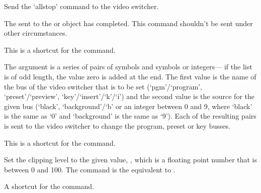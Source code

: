 

  \objListIOEnd






\objItemCommands[]

  \objListCmdBegin
  
  Send the `allstop' command to the video switcher.

  The  sent to the  or  object has completed.
  This command shouldn't be sent under other circumstances.

  This is a shortcut for the  command.

  The argument  is a series of pairs of symbols and symbols or integers---
  if the list is of odd length, the value zero is added at the end.
  The first value is the name of the bus of the video switcher that is to be set (`pgm'/`program',
  `preset'/`preview', `key'/`insert'/`k'/`i') and the second value is the source for the given bus
  (`black', `background'/`b' or an integer between 0 and 9, where `black' is the same as `0' and
  `background' is the same as `9').
  Each of the resulting pairs is sent to the video switcher to change the program, preset or key busses.

  This is a shortcut for the  command.

  Set the clipping level to the given value, , which is a floating point number
  that is between 0 and 100.
  The command is the equivalent to .

  A shortcut for the  command.

